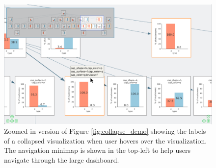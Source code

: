 \begin{figure}[ht!]
\centering
\includegraphics[width=\linewidth]{figures/minimap_zoom.png}
\caption{Zoomed-in version of Figure \ref{fig:collapse_demo} showing the labels of a collapsed visualization when user hovers over the visualization. The navigation minimap is shown in the top-left to help users navigate through the large dashboard.}
\label{fig:hover_minimap}
\end{figure}
